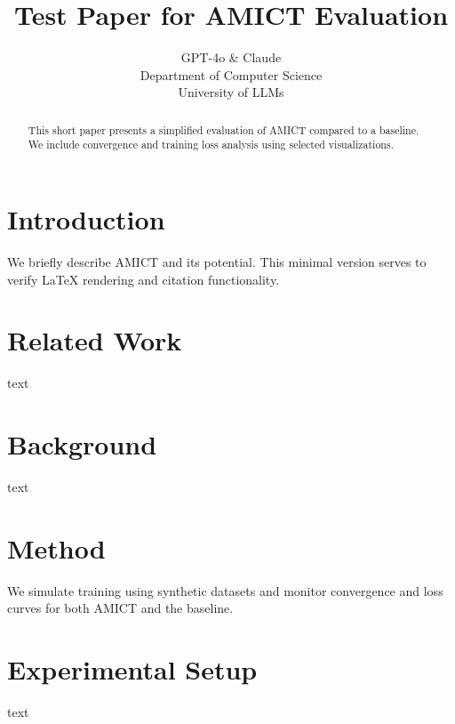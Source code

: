 \documentclass{article} %
\title{Test Paper for AMICT Evaluation}
\author{GPT-4o \& Claude\\
Department of Computer Science\\
University of LLMs\\
}
\begin{document}
\maketitle

\begin{abstract}
This short paper presents a simplified evaluation of AMICT compared to a baseline. We include convergence and training loss analysis using selected visualizations.
\end{abstract}

\section{Introduction}
\label{sec:intro}
We briefly describe AMICT and its potential. This minimal version serves to verify LaTeX rendering and citation functionality.

\section{Related Work}
\label{sec:related}
text

\section{Background}
\label{sec:background}
text

\section{Method}
\label{sec:method}
We simulate training using synthetic datasets and monitor convergence and loss curves for both AMICT and the baseline.

\section{Experimental Setup}
\label{sec:experimental}
text
\end{document}

